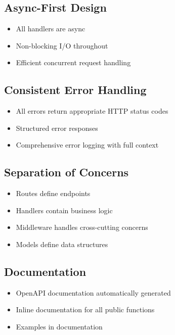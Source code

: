 \subsection{Async-First Design}

\begin{itemize}
  \item All handlers are async
  \item Non-blocking I/O throughout
  \item Efficient concurrent request handling
\end{itemize}

\subsection{Consistent Error Handling}

\begin{itemize}
  \item All errors return appropriate HTTP status codes
  \item Structured error responses
  \item Comprehensive error logging with full context
\end{itemize}

\subsection{Separation of Concerns}

\begin{itemize}
  \item Routes define endpoints
  \item Handlers contain business logic
  \item Middleware handles cross-cutting concerns
  \item Models define data structures
\end{itemize}

\subsection{Documentation}

\begin{itemize}
  \item OpenAPI documentation automatically generated
  \item Inline documentation for all public functions
  \item Examples in documentation
\end{itemize}

